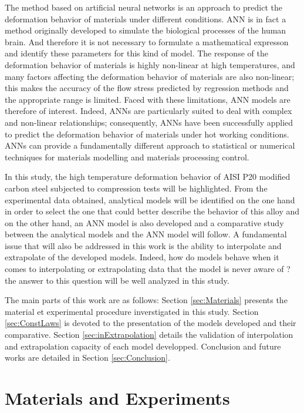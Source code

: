 \documentclass[twoside,english,1p,final,sort&compress]{elsarticle}
\theoremstyle{plain}
\begin{document}
The method based on artiﬁcial neural networks is an approach to predict the deformation behavior of materials under different conditions. ANN is in fact a method originally developed to simulate the biological processes of the human brain. And therefore it is not necessary to formulate a mathematical expresson and identify these parameters for this kind of model. The response of the deformation behavior of materials is highly non-linear at high temperatures, and many factors affecting the deformation behavior of materials are also non-linear; this makes the accuracy of the flow stress predicted by regression methods and the appropriate range is limited. Faced with these limitations, ANN models are therefore of interest.  Indeed, ANNs are particularly suited to deal with complex and non-linear relationships; consequently, ANNs have been successfully applied to predict the deformation behavior of materials under hot working conditions. ANNs can provide a fundamentally different approach to statistical or numerical techniques for materials modelling and materials processing control.

In this study, the high temperature deformation behavior of AISI P20 modified carbon steel subjected to compression tests will be highlighted. From the experimental data obtained, analytical models will be identified on the one hand in order to select the one that could better describe the behavior of this alloy and on the other hand, an ANN model is also developed and a comparative study between the analytical models and the ANN model will follow. A fundamental issue that will also be addressed in this work is the ability to interpolate and extrapolate of the developed models. Indeed, how do models behave when it comes to interpolating or extrapolating data that the model is never aware of ? the answer to this question will be well analyzed in this study.

The main parts of this work are as follows: Section \ref{sec:Materials} presents the material et experimental procedure inverstigated in this study. Section \ref{sec:ConstLaws} is devoted to the presentation of the models developed and their comparative. Section \ref{sec:inExtrapolation} details the validation of interpolation and extrapolation capacity of each model developped. Conclusion and future works are detailed in Section \ref{sec:Conclusion}.

\section{ Materials and Experiments \label{sec:Materials}}
\end{document}
